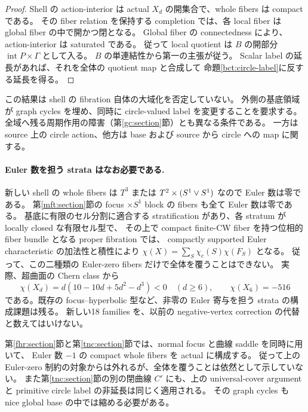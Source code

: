 \begin{proof}
Shell の action-interior は actual $X_d$ の開集合で、whole fibers は compact である。
その fiber relation を保持する completion では、各 local fiber は global fiber の中で開かつ閉となる。
Global fiber の connectedness により、action-interior は saturated である。
従って local quotient は $B$ の開部分 $\operatorname{int}P\times\Gamma$ として入る。
$B$ の単連結性から第一の主張が従う。
Scalar label の延長があれば、それを全体の quotient map と合成して
命題\ref{bct:circle-label}に反する延長を得る。
\end{proof}

この結果は shell の fibration 自体の大域化を否定していない。
外側の基底領域が graph cycles を埋め、同時に circle-valued label を変更することを要求する。
全域へ残る周期作用の障害（第\ref{gc:section}節）とも異なる条件である。
一方は source 上の circle action、他方は base および source から circle への map に関する。

\paragraph{Euler 数を担う strata はなお必要である.}
新しい shell の whole fibers は $T^3$ または $T^2\times(S^1\vee S^1)$ なので Euler 数は零である。
第\ref{mft:section}節の focus $\times S^1$ block の fibers も全て Euler 数は零である。
基底に有限のセル分割に適合する stratification があり、各 stratum が locally closed な有限セル型で、
その上で compact finite-CW fiber を持つ位相的 fiber bundle となる proper fibration では、
compactly supported Euler characteristic の加法性と積性により
$\chi(X)=\sum_S\chi_c(S)\chi(F_S)$ となる。
従って、この二種類の Euler-zero fibers だけで全体を覆うことはできない。
実際、超曲面の Chern class から
\[
 \chi(X_d)=d(10-10d+5d^2-d^3)<0\quad(d\ge6),
 \qquad\chi(X_6)=-516
\]
である。既存の focus--hyperbolic 型など、非零の Euler 寄与を担う strata の構成課題は残る。
新しい18 families を、以前の negative-vertex correction の代替と数えてはいけない。


第\ref{fhr:section}節と第\ref{tnc:section}節では、normal focus と曲線 saddle を同時に用いて、
Euler 数 $-1$ の compact whole fibers を actual に構成する。
従って上の Euler-zero 制約の対象からは外れるが、全体を覆うことは依然として示していない。
また第\ref{tnc:section}節の別の閉曲線 $C'$ にも、上の universal-cover argument と
primitive circle label の非延長は同じく適用される。
その graph cycles も nice global base の中では縮める必要がある。
